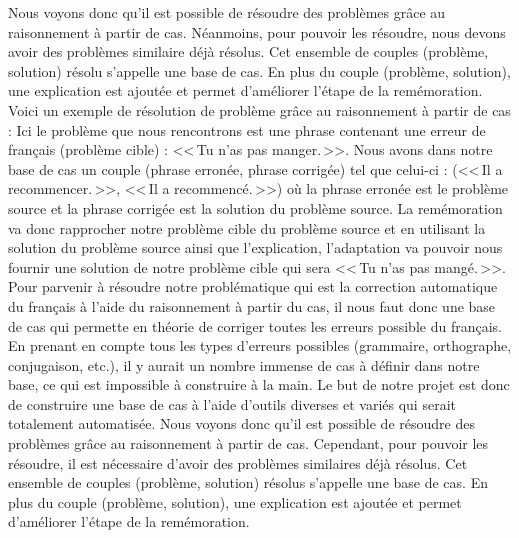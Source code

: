 \documentclass[11pt]{article}
\begin{document}
Nous voyons donc qu'il est possible de r\'{e}soudre des probl\`{e}mes gr\^ace au raisonnement \`{a} partir de cas. N\'{e}anmoins, pour pouvoir les r\'{e}soudre, nous devons avoir des probl\`{e}mes similaire d\'{e}j\`{a} r\'{e}solus. Cet ensemble de couples (probl\`{e}me, solution) r\'{e}solu s'appelle une base de cas. En plus du couple (probl\`{e}me, solution), une explication est ajout\'{e}e et permet d'am\'{e}liorer l'\'{e}tape de la rem\'{e}moration.
\newline
\newline
Voici un exemple de r\'{e}solution de probl\`{e}me gr\^ace au raisonnement \`{a} partir de cas : 
Ici le probl\`{e}me que nous rencontrons est une phrase contenant une erreur de fran\c{c}ais (probl\`{e}me cible) : <<\,Tu n'as pas manger.\,>>.
Nous avons dans notre base de cas un couple (phrase erron\'{e}e, phrase corrig\'{e}e) tel que celui-ci : (<<\,Il a recommencer.\,>>, <<\,Il a recommenc\'{e}.\,>>) o\`{u} la phrase erron\'{e}e est le probl\`{e}me source et la phrase corrig\'{e}e est la solution du probl\`{e}me source.
La rem\'{e}moration va donc rapprocher notre probl\`{e}me cible du probl\`{e}me source et en utilisant la solution du probl\`{e}me source ainsi que l'explication, l'adaptation va pouvoir nous fournir une solution de notre probl\`{e}me cible qui sera <<\,Tu n'as pas mang\'{e}.\,>>.
\newline
\newline
Pour parvenir \`{a} r\'{e}soudre notre probl\'{e}matique qui est la correction automatique du fran\c{c}ais \`{a} l'aide du raisonnement \`{a} partir du cas, il nous faut donc une base de cas qui permette en th\'{e}orie de corriger toutes les erreurs possible du fran\c{c}ais. En prenant en compte tous les types d'erreurs possibles (grammaire, orthographe, conjugaison, etc.), il y aurait un nombre immense de cas \`{a} d\'{e}finir dans notre base, ce qui est impossible \`{a} construire \`{a} la main. Le but de notre projet est donc de construire une base de cas \`{a} l'aide d'outils diverses et vari\'{e}s qui serait totalement automatis\'{e}e.
\newline
\newline
Nous voyons donc qu'il est possible de r\'{e}soudre des probl\`{e}mes gr\^{a}ce au raisonnement \`{a} partir de cas. Cependant, pour pouvoir les r\'{e}soudre, il est n\'{e}cessaire d'avoir des probl\`{e}mes similaires d\'{e}j\`{a} r\'{e}solus. Cet ensemble de couples (probl\`{e}me, solution) r\'{e}solus s'appelle une base de cas. En plus du couple (probl\`{e}me, solution), une explication est ajout\'{e}e et permet d'am\'{e}liorer l'\'{e}tape de la rem\'{e}moration.
\newline
\newline
\end{document}
